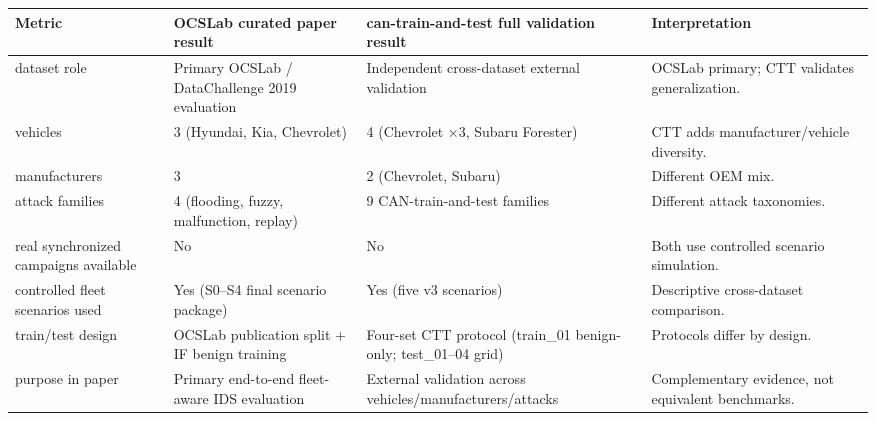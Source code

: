 \begin{tabular}{llll}
\toprule
Metric & OCSLab curated paper result & can-train-and-test full validation result & Interpretation \\
\midrule
dataset role & Primary OCSLab / DataChallenge 2019 evaluation & Independent cross-dataset external validation & OCSLab primary; CTT validates generalization. \\
vehicles & 3 (Hyundai, Kia, Chevrolet) & 4 (Chevrolet ×3, Subaru Forester) & CTT adds manufacturer/vehicle diversity. \\
manufacturers & 3 & 2 (Chevrolet, Subaru) & Different OEM mix. \\
attack families & 4 (flooding, fuzzy, malfunction, replay) & 9 CAN-train-and-test families & Different attack taxonomies. \\
real synchronized campaigns available & No & No & Both use controlled scenario simulation. \\
controlled fleet scenarios used & Yes (S0–S4 final scenario package) & Yes (five v3 scenarios) & Descriptive cross-dataset comparison. \\
train/test design & OCSLab publication split + IF benign training & Four-set CTT protocol (train_01 benign-only; test_01–04 grid) & Protocols differ by design. \\
purpose in paper & Primary end-to-end fleet-aware IDS evaluation & External validation across vehicles/manufacturers/attacks & Complementary evidence, not equivalent benchmarks. \\
\bottomrule
\end{tabular}
